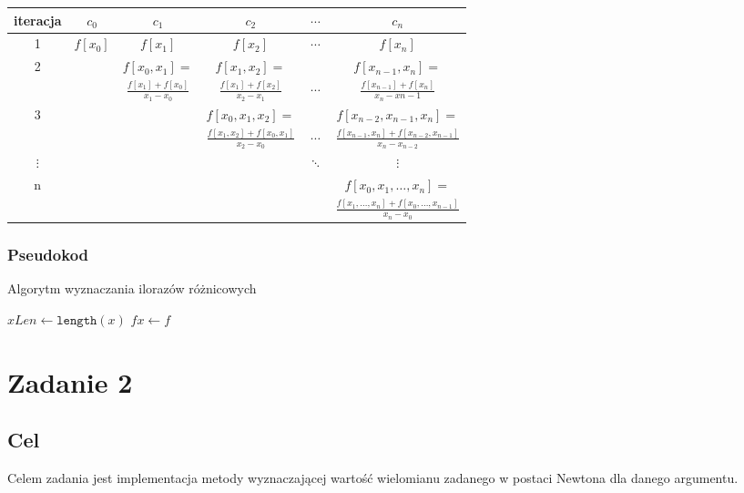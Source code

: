 \documentclass{article}
\begin{document}
\begin{center}
    \begin{tabular}{c|ccccc}
        iteracja & $c_0$ & $c_1$ & $c_2$ & $\cdots$ & $c_n$ \\
        \hline
        1 & $f[x_0]$ & $f[x_1]$ & $f[x_2]$ & $\cdots$ & $f[x_n]$ \\
        \hline
        2 & & $f[x_0, x_1] =$ & $f[x_1, x_2] =$ & & $f[x_{n-1}, x_{n}] =$ \\
        & & $\frac{f[x_1] + f[x_0]}{x_1 - x_0}$ & $\frac{f[x_1] + f[x_2]}{x_2 - x_1}$ & $\cdots$ & $\frac{f[x_{n-1}] + f[x_n]}{x_{n} - x{n-1}}$ \\
        \hline
        3 & & & $f[x_0, x_1, x_2] =$ & & $f[x_{n-2}, x_{n-1}, x_n] =$ \\
        & & & $\frac{f[x_1, x_2] + f[x_0, x_1]}{x_2 - x_0}$ & $\cdots$ & $\frac{f[x_{n-1}, x_{n}] + f[x_{n-2}, x_{n-1}]}{x_n - x_{n-2}}$ \\
        \hline
        $\vdots$ & & & & $\ddots$ & $\vdots$ \\
        \hline
        n & & & & & $f[x_0, x_1, \ldots, x_n] =$ \\
        & & & & & $\frac{f[x_1, \ldots, x_n] + f[x_0, \ldots, x_{n-1}]}{x_n - x_0}$
    \end{tabular}
\end{center}

\newpage

\subsubsection{Pseudokod}
\begin{algorithm}
    \caption{Algorytm wyznaczania ilorazów różnicowych}
    \DontPrintSemicolon
    $xLen \gets \texttt{length}(x)$\;
    $fx \gets f$\;
    
\end{algorithm}

\section{Zadanie 2}
\subsection{Cel}
Celem zadania jest implementacja metody wyznaczającej wartość wielomianu zadanego w postaci Newtona dla danego argumentu.
\end{document}
